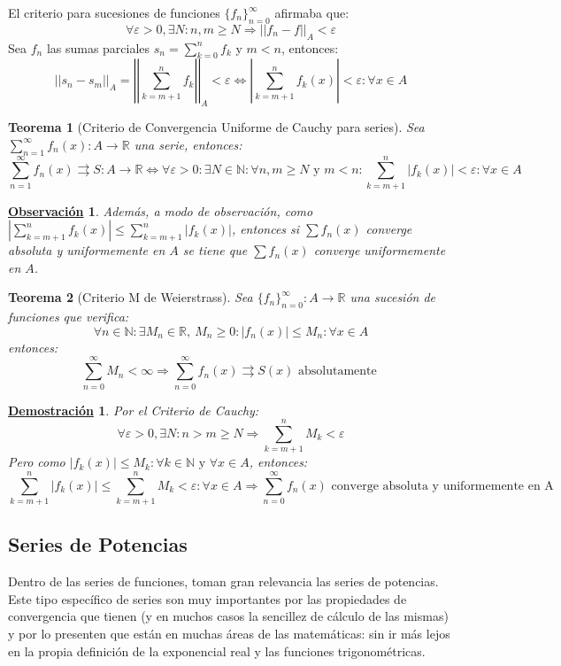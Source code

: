 \documentclass[10pt,a4paper,openright]{book}
\theoremstyle{break}
\newtheorem{theo}{Teorema}[chapter]
\newtheorem*{demo}{\underline{Demostración}}
\newtheorem{obs}{\underline{Observación}}[chapter]
\begin{document}
El criterio para sucesiones de funciones $\{f_n\}_{n = 0}^\infty$ afirmaba que:
$$\forall \varepsilon > 0, \exists N : n,m \geq N \Rightarrow ||f_n  - f||_A  < \varepsilon$$
Sea $f_n$ las sumas parciales $s_n =  \sum_{k=0}^{n} f_k$ y $m < n$, entonces:
$$||s_n - s_m||_A = \left|\left|\sum_{k=m + 1}^{n} f_k \right|\right|_A < \varepsilon \Leftrightarrow \left|\sum_{k=m + 1}^{n} f_k (x)\right| < \varepsilon : \forall x \in A$$

\begin{theo}[Criterio de Convergencia Uniforme de Cauchy para series]
Sea $\sum_{n=1}^\infty f_n (x): A \rightarrow \mathbb{R}$ una serie, entonces:
$$\sum_{n=1}^\infty f_n (x) \rightrightarrows S:A\rightarrow \mathbb{R} \Leftrightarrow \forall \varepsilon > 0: \exists N \in \mathbb{N}: \forall n,m \geq N \mbox{ y } m < n : \sum_{k=m + 1}^{n} |f_k (x)| < \varepsilon : \forall x \in A$$
\end{theo}

\begin{obs}
Además, a modo de observación, como $ |\sum_{k=m + 1}^{n} f_k (x)| \leq \sum_{k=m + 1}^{n} |f_k (x)| $, entonces si $\sum f_n (x)$ converge absoluta y uniformemente en $A$ se tiene que $\sum f_n (x)$ converge uniformemente en $A$.
\end{obs}

\begin{theo}[Criterio M de Weierstrass]
Sea $\{f_n\}_{n = 0}^\infty : A \rightarrow \mathbb{R}$ una sucesión de funciones que verifica:
$$\forall n \in \mathbb{N}: \exists M_n \in \mathbb{R},\  M_n \geq 0: |f_n (x)| \leq M_n : \forall x \in A$$
entonces:
$$\sum_{n= 0}^{\infty} M_n < \infty \Rightarrow \sum_{n = 0}^{\infty} f_n(x) \rightrightarrows  S(x) \mbox{ absolutamente }$$
\end{theo}
\begin{demo}
Por el Criterio de Cauchy:
$$\forall \varepsilon >0, \exists N : n > m \geq N \Rightarrow \sum_{k=m+1}^{n} M_k < \varepsilon$$
Pero como $|f_k (x)| \leq M_k : \forall k \in \mathbb{N} \mbox{ y } \forall x \in A$, entonces:
$$\sum_{k=m+1}^{n} |f_k (x)| \leq \sum_{k=m+1}^{n} M_k < \varepsilon : \forall x \in A \Rightarrow \sum_{n=0}^{\infty} f_n (x) \mbox{ converge absoluta y uniformemente en A}$$
\end{demo}

\subsection{Series de Potencias}
Dentro de las series de funciones, toman gran relevancia las series de potencias. Este tipo específico de series son muy importantes por las propiedades de convergencia que tienen (y en muchos casos la sencillez de cálculo de las mismas) y por lo presenten que están en muchas áreas de las matemáticas: sin ir más lejos en la propia definición de la exponencial real y las funciones trigonométricas.
\end{document}
